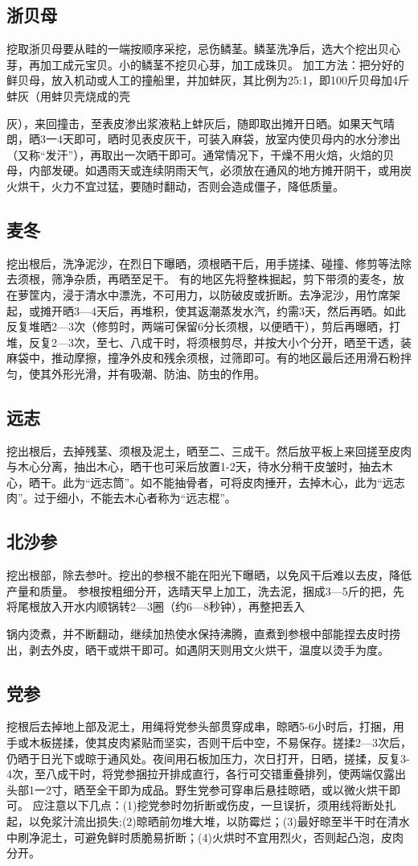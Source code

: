 \documentclass{ctexbook}
\begin{document}
\subsection{浙贝母}
挖取浙贝母要从畦的一端按顺序采挖，忌伤鳞茎。鳞茎洗净后，选大个挖出贝心芽，再加工成元宝贝。小的鳞茎不挖贝心芽，加工成珠贝。
加工方法：把分好的鲜贝母，放入机动或人工的撞船里，并加蚌灰，其比例为25:1，即100斤贝母加4斤蚌灰（用蚌贝壳烧成的壳

灰），来回撞击，至表皮渗出浆液粘上蚌灰后，随即取出摊开日晒。如果天气晴朗，晒3一4天即可，晒时见表皮灰干，可装入麻袋，放室内使贝母内的水分渗出（又称“发汗”），再取出一次晒干即可。通常情况下，干燥不用火焙，火焙的贝母，内部发硬。如遇雨天或连续阴雨天气，必须放在通风的地方摊开阴干，或用炭火烘干，火力不宜过猛，要随时翻动，否则会造成僵子，降低质量。
\subsection{麦冬}
挖出根后，洗净泥沙，在烈日下曝晒，须根晒干后，用手搓揉、碰撞、修剪等法除去须根，筛净杂质，再晒至足干。
有的地区先将整株掘起，剪下带须的麦冬，放在萝筐内，浸于清水中漂洗，不可用力，以防破皮或折断。去净泥沙，用竹席架起，或摊开晒3—4天后，再堆积，使其返潮蒸发水汽，约需3天，然后再晒。如此反复堆晒2—3次（修剪时，两端可保留6分长须根，以便晒干），剪后再曝晒，打堆，反复2—3次，至七、八成干时，将须根剪尽，并按大小个分开，晒至干透，装麻袋中，推动摩擦，撞净外皮和残余须根，过筛即可。有的地区最后还用滑石粉拌匀，使其外形光滑，并有吸潮、防油、防虫的作用。
\subsection{远志}
挖出根后，去掉残茎、须根及泥土，晒至二、三成干。然后放平板上来回搓至皮肉与木心分离，抽出木心，晒干也可采后放置1-2天，待水分稍干皮皱时，抽去木心，晒干。此为“远志筒”。如不能抽骨者，可将皮肉捶开，去掉木心，此为“远志肉”。过于细小，不能去木心者称为“远志棍”。
\subsection{北沙参}
挖出根部，除去参叶。挖出的参根不能在阳光下曝晒，以免风干后难以去皮，降低产量和质量。
参根按粗细分开，选晴天早上加工，洗去泥，捆成3—5斤的把，先将尾根放入开水内顺锅转2—3圈（约6—8秒钟），再整把丢入

锅内烫煮，并不断翻动，继续加热使水保持沸腾，直煮到参根中部能捏去皮时捞出，剥去外皮，晒干或烘干即可。如遇阴天则用文火烘干，温度以烫手为度。
\subsection{党参}
挖根后去掉地上部及泥土，用绳将党参头部贯穿成串，晾晒5-6小时后，打捆，用手或木板搓揉，使其皮肉紧贴而坚实，否则干后中空，不易保存。搓揉2—3次后，仍晒于日光下或晾于通风处。夜间用石板加压力，次日打开，日晒，搓揉，反复3-4次，至八成干时，将党参捆拉开排成直行，各行可交错重叠排列，使两端仅露出头部1一2寸，晒至全干即为成品。野生党参可穿串后悬挂晾晒，或以微火烘干即可。
应注意以下几点：(1)挖党参时勿折断或伤皮，一旦误折，须用线将断处扎起，以免浆汁流出损失;(2)晾晒前勿堆大堆，以防霉烂；(3)最好晾至半干时在清水中刷净泥土，可避免鲜时质脆易折断；(4)火烘时不宜用烈火，否则起凸泡，皮肉分开。
\end{document}
